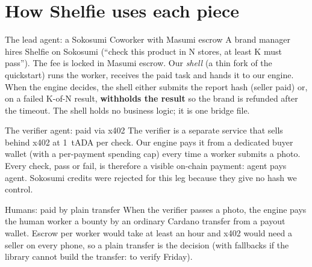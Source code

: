 \section{How Shelfie uses each piece}

\begin{shelfiebox}{The lead agent: a Sokosumi Coworker with Masumi escrow}
A brand manager hires Shelfie on Sokosumi (``check this product in N stores, at least K must pass''). The fee is locked in Masumi escrow. Our \emph{shell} (a thin fork of the quickstart) runs the worker, receives the paid task and hands it to our engine. When the engine decides, the shell either submits the report hash (seller paid) or, on a failed K-of-N result, \textbf{withholds the result} so the brand is refunded after the timeout. The shell holds no business logic; it is one bridge file.
\end{shelfiebox}

\begin{shelfiebox}{The verifier agent: paid via x402}
The verifier is a separate service that sells  behind x402 at 1~tADA per check. Our engine pays it from a dedicated buyer wallet (with a per-payment spending cap) every time a worker submits a photo. Every check, pass or fail, is therefore a visible on-chain payment: agent pays agent. Sokosumi credits were rejected for this leg because they give no hash we control.
\end{shelfiebox}

\begin{shelfiebox}{Humans: paid by plain transfer}
When the verifier passes a photo, the engine pays the human worker a bounty by an ordinary Cardano transfer from a payout wallet. Escrow per worker would take at least an hour and x402 would need a seller on every phone, so a plain transfer is the decision (with fallbacks if the library cannot build the transfer: to verify Friday).
\end{shelfiebox}


